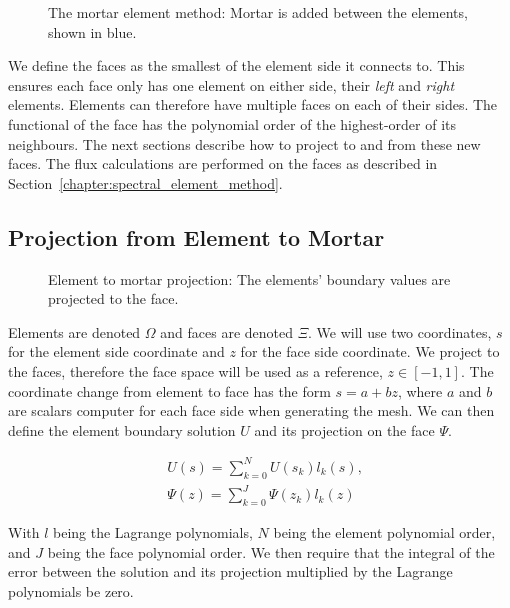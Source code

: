 \begin{figure}[H]
	\centering
	
	\caption{The mortar element method: Mortar is added between the elements, shown in blue.}\label{fig:mortar_element_method}
\end{figure}

We define the faces as the smallest of the element side it connects to. This ensures each face only
has one element on either side, their \textit{left} and \textit{right} elements. Elements can
therefore have multiple faces on each of their sides. The functional of the face has the polynomial
order of the highest-order of its neighbours. The next sections describe how to project to and from
these new faces. The flux calculations are performed on the faces as described in
Section~\ref{chapter:spectral_element_method}. 

\subsection{Projection from Element to Mortar}\label{subsection:adaptive_mesh_refinement:mortar_element_method:element_to_mortar}

\begin{figure}[H]
	\centering
	
	\caption{Element to mortar projection: The elements' boundary values are projected to the face.}\label{fig:element_to_mortar}
\end{figure}

Elements are denoted \(\Omega \) and faces are denoted \(\Xi \). We will use two coordinates, \(s\)
for the element side coordinate and \(z\) for the face side coordinate. We project to the faces,
therefore the face space will be used as a reference, \(z \in [-1, 1]\). The coordinate change from
element to face has the form \(s = a + bz\), where \(a\) and \(b\) are scalars computer for each
face side when generating the mesh. We can then define the element boundary solution \(U\) and its
projection on the face \(\Psi \). 

\begin{align} 
	& U(s) = \sum_{k = 0}^{N} U(s_k) l_k(s), \label{equ:element_boundary_solution} \\
	& \Psi (z) = \sum_{k = 0}^{J} \Psi(z_k) l_k(z) \label{equ:face_projected_solution}
\end{align}

With \(l\) being the Lagrange polynomials, \(N\) being the element polynomial order, and \(J\) being
the face polynomial order. We then require that the integral of the error between the solution and
its projection multiplied by the Lagrange polynomials be zero. 


